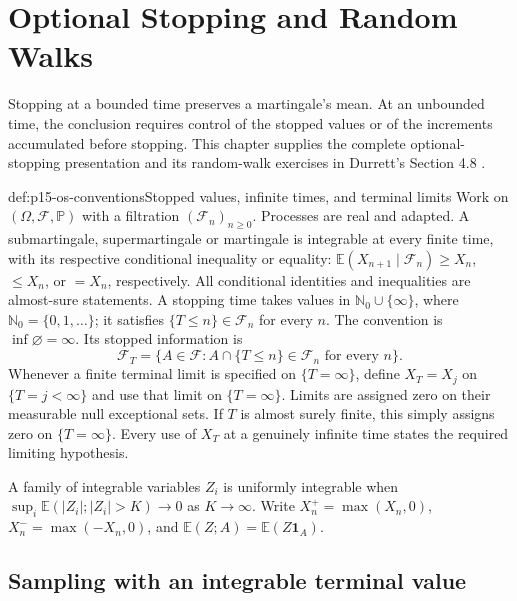 \chapter{Optional Stopping and Random Walks}
\label{sec:p15-optional-stopping-and-random-walks}

Stopping at a bounded time preserves a martingale's mean.
At an unbounded time, the conclusion requires control of the
stopped values or of the increments accumulated before stopping.
This chapter supplies the complete optional-stopping presentation
and its random-walk exercises in Durrett's Section 4.8
\cite[pp.~255--262]{DurrettPTEAuthor2019}.

\begin{hbdefinition}{def:p15-os-conventions}{Stopped values, infinite times, and terminal limits}
Work on \((\Omega,\mathcal F,\mathbb P)\) with a filtration
\((\mathcal F_n)_{n\geq0}\). Processes are real and adapted.
A submartingale, supermartingale or martingale is integrable at
every finite time, with its respective conditional inequality or
equality: \(\mathbb E(X_{n+1}\mid\mathcal F_n)\geq X_n\),
\(\leq X_n\), or \(=X_n\), respectively.
All conditional identities and inequalities are almost-sure statements.
A stopping time takes values in
\(\mathbb N_0\cup\{\infty\}\), where \(\mathbb N_0=\{0,1,\ldots\}\);
it satisfies \(\{T\leq n\}\in\mathcal F_n\) for every \(n\).
The convention is \(\inf\varnothing=\infty\). Its stopped information is
\[
 \mathcal F_T=\{A\in\mathcal F:
                    A\cap\{T\leq n\}\in\mathcal F_n
                    \text{ for every }n\}.
 \]
Whenever a finite terminal limit is specified on \(\{T=\infty\}\),
define \(X_T=X_j\) on \(\{T=j<\infty\}\) and use that limit
on \(\{T=\infty\}\). Limits are assigned zero on their measurable
null exceptional sets. If \(T\) is almost surely finite, this
simply assigns zero on \(\{T=\infty\}\).
Every use of \(X_T\) at a genuinely infinite time states the
required limiting hypothesis.

A family of integrable variables \(Z_i\) is uniformly integrable
when
\(\sup_i\mathbb E(|Z_i|;|Z_i|>K)\to0\) as \(K\to\infty\).
Write \(X_n^+=\max(X_n,0)\), \(X_n^-=\max(-X_n,0)\), and
\(\mathbb E(Z;A)=\mathbb E(Z\mathbf1_A)\).
\end{hbdefinition}

\section{Sampling with an integrable terminal value}
\label{sec:p15-os-sampling}

